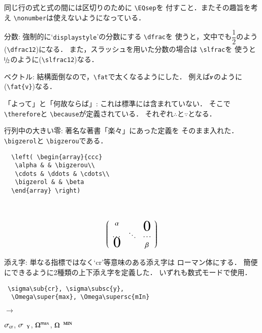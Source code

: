 \documentclass[onecolumn]{jsce}  %
\begin{document}
\begin{Description}
\noindent
同じ行の式と式の間には区切りのために \verb+\EQsep+を
付すこと．またその趣旨を考え \verb+\nonumber+は使えないようになっている．
%
\item[分数:] 強制的に`{\tt displaystyle}'の分数にする \verb+\dfrac+を
使うと，文中でも$\dfrac12$のよう(\verb+\dfrac12+)になる．
また，スラッシュを用いた分数の場合は \verb+\slfrac+を
使うと$\slfrac12$のように(\verb+\slfrac12+)なる．
%
\item[ベクトル:] 結構面倒なので，\verb+\fat+で太くなるようにした．
例えば$\mbox{\boldmath{$v$}}$のように(\verb+\fat{v}+)なる．
%
\item[「よって」と「何故ならば」:] これは標準には含まれていない．
そこで \verb+\therefore+と \verb+\because+が定義されている．
それぞれ$\therefore$と$\because$となる．
%
\item[行列中の大きい零:] 著名な著書「楽々\cite{rakuraku}」にあった定義を
そのまま入れた．\verb+\bigzerol+と \verb+\bigzerou+である．
\medskip

\noindent
\mbox{}\hfill
\begin{minipage}[c]{.35\textwidth}
\renewcommand{\baselinestretch}{.75}\small\normalsize
\begin{verbatim}
  \left( \begin{array}{ccc}
   \alpha & & \bigzerou\\
   \cdots & \ddots & \cdots\\
   \bigzerol & & \beta
  \end{array} \right)
\end{verbatim}
\renewcommand{\baselinestretch}{1}\small\normalsize
\end{minipage}
~~~%
\begin{minipage}[c]{.35\textwidth}
\begin{eqnarray*}
\left( \begin{array}{ccc}
 \alpha & & \bigzerou\\
 \cdots & \ddots & \cdots\\
 \bigzerol & & \beta
\end{array} \right)
\end{eqnarray*}
\end{minipage}
\hfill\mbox{}
%
\item[添え字:] 単なる指標ではなく`cr'等意味のある添え字は
ローマン体にする．
簡便にできるように2種類の上下添え字を定義した．
いずれも数式モードで使用．
\medskip

\noindent
\mbox{}\hfill
\begin{minipage}[c]{.45\textwidth}
\renewcommand{\baselinestretch}{0.75}\small\normalsize
\begin{verbatim}
 \sigma\sub{cr}, \sigma\subsc{y},
  \Omega\super{max}, \Omega\supersc{mIn}
\end{verbatim}
\renewcommand{\baselinestretch}{1}\small\normalsize
\end{minipage}
\hfill$\to$\hfill
\begin{minipage}[c]{.3\textwidth}
$\sigma\sub{cr}$, $\sigma\subsc{y}$,
 $\Omega\super{max}$, $\Omega\supersc{mIn}$
\end{minipage}
\hfill\mbox{}
\medskip


\end{Description}
\end{document}
